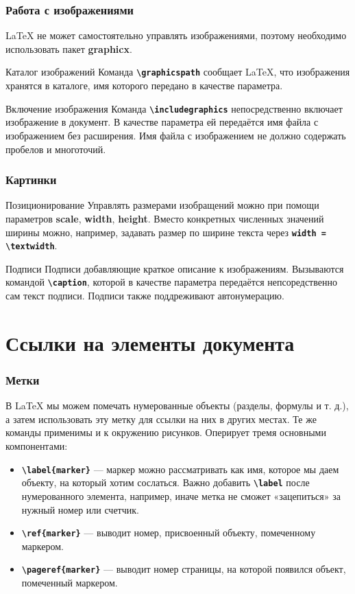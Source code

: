 \documentclass[aspectratio=169]{beamer}
\begin{document}
\begin{frame}
\frametitle{Работа с изображениями}
\LaTeX{} не может самостоятельно управлять изображениями, поэтому необходимо использовать пакет \textbf{graphicx}.
\begin{exampleblock}{Каталог изображений}
Команда \texttt{\textbf{\textbackslash graphicspath}} сообщает \LaTeX{}, что изображения хранятся в каталоге, имя которого передано в качестве параметра.
\end{exampleblock}
\begin{exampleblock}{Включение изображения}
Команда \texttt{\textbf{\textbackslash includegraphics}} непосредственно включает изображение в документ.
В качестве параметра ей передаётся имя файла с изображением без расширения.
Имя файла с изображением не должно содержать пробелов и многоточий.
\end{exampleblock}
\end{frame}

\begin{frame}
\frametitle{Картинки}
\begin{exampleblock}{Позиционирование}
Управлять размерами изобращений можно при помощи параметров \textbf{scale}, \textbf{width}, \textbf{height}.
Вместо конкретных численных значений ширины можно, например, задавать размер по ширине текста через \texttt{\textbf{width = \textbackslash textwidth}}.
\end{exampleblock}
\begin{exampleblock}{Подписи}
Подписи добавляющие краткое описание к изображениям.
Вызываются командой \texttt{\textbf{\textbackslash caption}}, которой в качестве параметра передаётся непсоредственно сам текст подписи.
Подписи также поддреживают автонумерацию.
\end{exampleblock}
\end{frame}

\section{Ссылки на элементы документа}

\begin{frame}
\frametitle{Метки}
В \LaTeX{} мы можем помечать нумерованные объекты (разделы, формулы и т. д.), а затем использовать эту метку для ссылки на них в других местах.
Те же команды применимы и к окружению рисунков.
Оперирует тремя основными компонентами:
\begin{itemize}
\item \texttt{\textbf{\textbackslash label\{marker\}}} --- маркер можно рассматривать как имя, которое мы даем объекту, на который хотим сослаться. Важно добавить \texttt{\textbf{\textbackslash label}} после нумерованного элемента, например, иначе метка не сможет «зацепиться» за нужный номер или счетчик.
\item \texttt{\textbf{\textbackslash ref\{marker\}}} --- выводит номер, присвоенный объекту, помеченному маркером.
\item \texttt{\textbf{\textbackslash pageref\{marker\}}} --- выводит номер страницы, на которой появился объект, помеченный маркером.
\end{itemize}
\end{frame}
\end{document}

